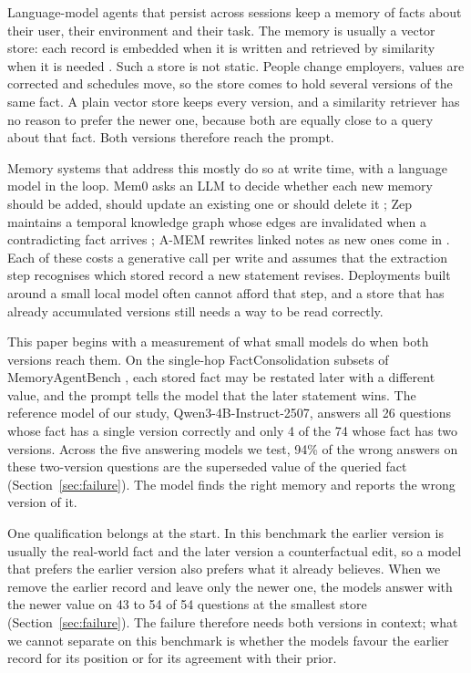 \documentclass[journal=jcisd8,manuscript=article]{achemso}
\begin{document}
Language-model agents that persist across sessions keep a memory of facts about their user, their environment and their task. The memory is usually a vector store: each record is embedded when it is written and retrieved by similarity when it is needed \cite{lewis2020rag,park2023generative,packer2023memgpt,zhang2024memorysurvey}. Such a store is not static. People change employers, values are corrected and schedules move, so the store comes to hold several versions of the same fact. A plain vector store keeps every version, and a similarity retriever has no reason to prefer the newer one, because both are equally close to a query about that fact. Both versions therefore reach the prompt.

Memory systems that address this mostly do so at write time, with a language model in the loop. Mem0 asks an LLM to decide whether each new memory should be added, should update an existing one or should delete it \cite{chhikara2025mem0}; Zep maintains a temporal knowledge graph whose edges are invalidated when a contradicting fact arrives \cite{rasmussen2025zep}; A-MEM rewrites linked notes as new ones come in \cite{xu2025amem}. Each of these costs a generative call per write and assumes that the extraction step recognises which stored record a new statement revises. Deployments built around a small local model often cannot afford that step, and a store that has already accumulated versions still needs a way to be read correctly.

This paper begins with a measurement of what small models do when both versions reach them. On the single-hop FactConsolidation subsets of MemoryAgentBench \cite{hu2026memoryagentbench}, each stored fact may be restated later with a different value, and the prompt tells the model that the later statement wins. The reference model of our study, Qwen3-4B-Instruct-2507, answers all 26 questions whose fact has a single version correctly and only 4 of the 74 whose fact has two versions. Across the five answering models we test, 94\% of the wrong answers on these two-version questions are the superseded value of the queried fact (Section~\ref{sec:failure}). The model finds the right memory and reports the wrong version of it.

One qualification belongs at the start. In this benchmark the earlier version is usually the real-world fact and the later version a counterfactual edit, so a model that prefers the earlier version also prefers what it already believes. When we remove the earlier record and leave only the newer one, the models answer with the newer value on 43 to 54 of 54 questions at the smallest store (Section~\ref{sec:failure}). The failure therefore needs both versions in context; what we cannot separate on this benchmark is whether the models favour the earlier record for its position or for its agreement with their prior.
\end{document}
